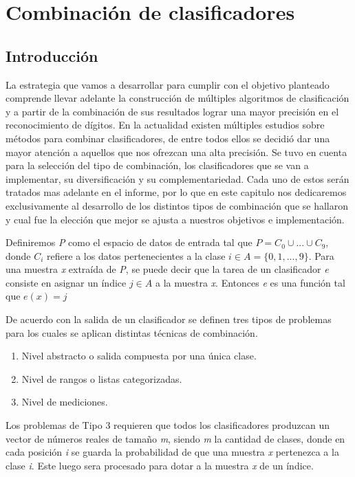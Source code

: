 \chapter{Combinación de clasificadores}
\section{Introducción}
La estrategia que vamos a desarrollar para cumplir con el objetivo planteado comprende llevar adelante la construcción de múltiples algoritmos de clasificación y a partir de la combinación de sus resultados lograr una mayor precisión en el reconocimiento de dígitos. En la actualidad existen múltiples estudios sobre métodos para combinar clasificadores, de entre todos ellos se decidió dar una mayor atención a aquellos que nos ofrezcan una alta precisión. Se tuvo en cuenta para la selección del tipo de combinación, los clasificadores que se van a implementar, su diversificación y su complementariedad. Cada uno de estos serán tratados mas adelante en el informe, por lo que en este capitulo nos dedicaremos exclusivamente al desarrollo de los distintos tipos de combinación que se hallaron y cual fue la elección que mejor se ajusta a nuestros objetivos e implementación.

Definiremos \textit{P} como el espacio de datos de entrada tal que $ P = C_{0}\cup...\cup C_{9} $, donde $ C_{i} $ refiere a los datos pertenecientes a la clase $ \textit{i} \in A = \{0,1,...,9\} $. Para una muestra \textit{x} extraída de \textit{P}, se puede decir que la tarea de un clasificador \textit{e} consiste en asignar un índice $ \textit{j}\in A $ a la muestra \textit{x}. Entonces \textit{e} es una función tal que $ e(x) = j  $

De acuerdo con la salida de un clasificador se definen tres tipos de problemas para los cuales se aplican distintas técnicas de combinación.
\begin{enumerate}
  \item Nivel abstracto o salida compuesta por una única clase.
  \item Nivel de rangos o listas categorizadas.
  \item Nivel de mediciones.
\end{enumerate}
Los problemas de Tipo 3 requieren que todos los clasificadores produzcan un vector de números reales de tamaño \textit{m}, siendo \textit{m} la cantidad de clases, donde en cada posición \textit{i} se guarda la probabilidad de que una muestra \textit{x} pertenezca a la clase \textit{i}. Este luego sera procesado para dotar a la muestra \textit{x} de un índice.

